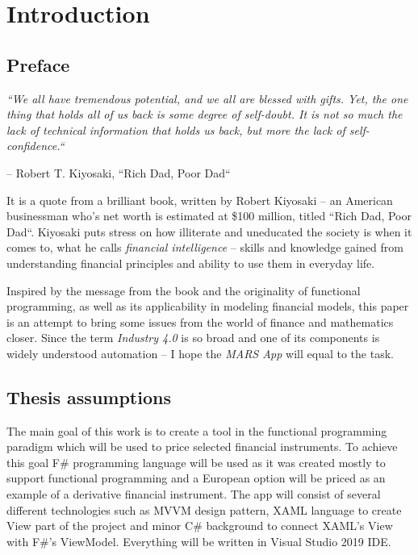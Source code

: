 \chapter{Introduction}
\section{Preface}
    \textit{``We all have tremendous potential, and we all are blessed with gifts. Yet, the one thing that holds all of us back is some degree of self-doubt. It is not so much the lack of technical information that holds us back, but more the lack of self-confidence.``}
    \begin{flushright}
    -- Robert T. Kiyosaki, ``Rich Dad, Poor Dad``\\
    \end{flushright}
    It is a quote from a brilliant book, written by Robert Kiyosaki -- an American businessman who's net worth is estimated at \$100 million, titled ``Rich Dad, Poor Dad``. Kiyosaki puts stress on how illiterate and uneducated the society is when it comes to, what he calls \textit{financial intelligence} -- skills and knowledge gained from understanding financial principles and ability to use them in everyday life.
    
    Inspired by the message from the book and the originality of functional programming, as well as its applicability in modeling financial models, this paper is an attempt to bring some issues from the world of finance and mathematics closer. Since the term \textit{Industry 4.0} is so broad and one of its components is widely understood automation -- I hope the \textit{MARS App} will equal to the task.
    
\section{Thesis assumptions}
    The main goal of this work is to create a tool in the functional programming paradigm which will be used to price selected financial instruments. To achieve this goal F\# programming language will be used as it was created mostly to support functional programming and a European option will be priced as an example of a derivative financial instrument.
    The app will consist of several different technologies such as MVVM design pattern, XAML language to create View part of the project and minor C\# background to connect XAML's View with F\#'s ViewModel. Everything will be written in Visual Studio 2019 IDE.
    
